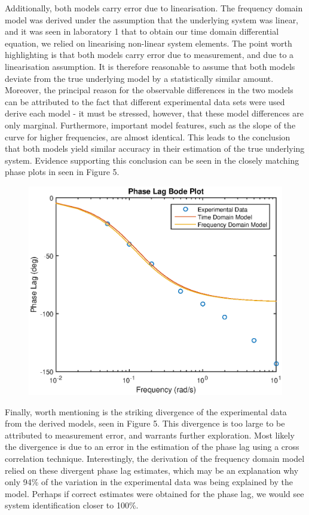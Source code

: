 \documentclass{article}
\begin{document}
Additionally, both models carry error due to linearisation. The frequency domain model was derived under the assumption that the underlying system was linear, and it was seen in laboratory 1 that to obtain our time domain differential equation, we relied on linearising non-linear system elements. The point worth highlighting is that both models carry error due to measurement, and due to a linearisation assumption. It is therefore reasonable to assume that both models deviate from the true underlying model by a statistically similar amount. Moreover, the principal reason for the observable differences in the two models can be attributed to the fact that different experimental data sets were used derive each model - it must be stressed, however, that these model differences are only marginal. Furthermore, important model features, such as the slope of the curve for higher frequencies, are almost identical. This leads to the conclusion that both models yield similar accuracy in their estimation of the true underlying system. Evidence supporting this conclusion can be seen in the closely matching phase plots in seen in Figure 5.

\begin{figure}[H]
	\centering
	\includegraphics[scale=0.7]{fig4.eps}
\end{figure}

Finally, worth mentioning is the striking divergence of the experimental data from the derived models, seen in Figure 5. This divergence is too large to be attributed to measurement error, and warrants further exploration. Most likely the divergence is due to an error in the estimation of the phase lag using a cross correlation technique. Interestingly, the derivation of the frequency domain model relied on these divergent phase lag estimates, which may be an explanation why only 94\% of the variation in the experimental data was being explained by the model. Perhaps if correct estimates were obtained for the phase lag, we would see system identification closer to 100\%.
\end{document}
